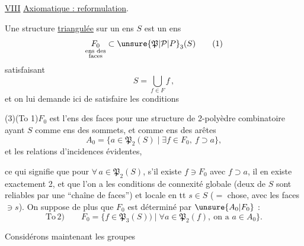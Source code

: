 
\uline{VIII} \uline{Axiomatique : reformulation}.

Une structure \uline{triangulée} sur un ens $S$ est un ens
\[
\underset{\substack{\text{ens des}\\\text{faces}}}{F_0}\subset\unsure{\mathfrak{P}|\mathcal{P}|P}_3(S)\tag*{(1)}
\]
satisfaisant
\[
S=\bigcup_{f\in F}f\,,\tag*{(2)}
\]
et on lui demande ici de satisfaire les conditions

(3)\qquad (To 1)\qquad $F_0$ est l'ens des faces pour une structure de 2-polyèdre  combinatoire  ayant $S$ comme ens des sommets, et comme ens des arêtes
\[
A_0=\{a\in\mathfrak{P}_2(S)\mid\exists f\in F_0,\ f\supset a\},
\]
et les relations d'incidences évidentes,

ce qui signifie que pour $\forall\,a\in\mathfrak{P}_2(S)$, s'il existe $f\ni F_0$ avec $f\supset a$, il en existe exactement 2, et que l'on a les conditions de connexité globale (deux  de $S$ sont reliables par une ``chaîne de faces'') et locale en tt $s\in S$ ($=$ chose, avec les faces $\ni s$). On suppose de plus que $F_0$ est déterminé par $\unsure{A_0|F_0}$ :
\[
\mathrm{To}\,2)\qquad F_0=\{f\in\mathfrak{P}_3(S))\mid\forall a\in\mathfrak{P}_2(f),\ \text{on a }a\in A_0\}.\tag*{(4)}
\]

Considérons maintenant les  groupes

